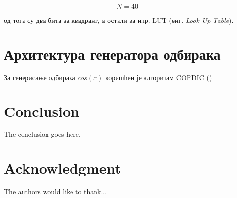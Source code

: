 \documentclass[conference]{IEEEJERM}
\begin{document}
\begin{equation}
N = 40
\end{equation}

од тога су два бита за квадрант, а остали за нпр. LUT (енг. \textit{Look Up Table}).

\section{Архитектура генератора одбирака}

За генерисање одбирака  $cos(x)$ коришћен је алгоритам CORDIC ()


\section{Conclusion}
The conclusion goes here.




\section*{Acknowledgment}


The authors would like to thank...


\begin{thebibliography}{1}


\end{thebibliography}
\end{document}
